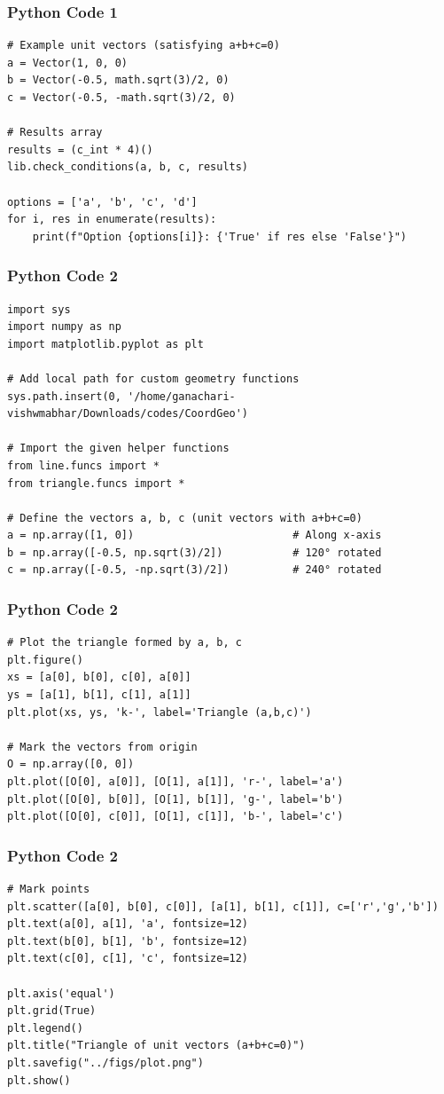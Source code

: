 \documentclass{beamer}
\begin{document}
\begin{frame}[fragile]
    \frametitle{Python Code 1}
    \begin{lstlisting}
# Example unit vectors (satisfying a+b+c=0)
a = Vector(1, 0, 0)
b = Vector(-0.5, math.sqrt(3)/2, 0)
c = Vector(-0.5, -math.sqrt(3)/2, 0)

# Results array
results = (c_int * 4)()
lib.check_conditions(a, b, c, results)

options = ['a', 'b', 'c', 'd']
for i, res in enumerate(results):
    print(f"Option {options[i]}: {'True' if res else 'False'}")
    \end{lstlisting}
\end{frame}

\begin{frame}[fragile]
    \frametitle{Python Code 2}
    \begin{lstlisting}
import sys
import numpy as np
import matplotlib.pyplot as plt

# Add local path for custom geometry functions
sys.path.insert(0, '/home/ganachari-vishwmabhar/Downloads/codes/CoordGeo')

# Import the given helper functions
from line.funcs import *
from triangle.funcs import *

# Define the vectors a, b, c (unit vectors with a+b+c=0)
a = np.array([1, 0])                         # Along x-axis
b = np.array([-0.5, np.sqrt(3)/2])           # 120° rotated
c = np.array([-0.5, -np.sqrt(3)/2])          # 240° rotated
    \end{lstlisting}
\end{frame}

\begin{frame}[fragile]
    \frametitle{Python Code 2}
    \begin{lstlisting}
# Plot the triangle formed by a, b, c
plt.figure()
xs = [a[0], b[0], c[0], a[0]]
ys = [a[1], b[1], c[1], a[1]]
plt.plot(xs, ys, 'k-', label='Triangle (a,b,c)')

# Mark the vectors from origin
O = np.array([0, 0])
plt.plot([O[0], a[0]], [O[1], a[1]], 'r-', label='a')
plt.plot([O[0], b[0]], [O[1], b[1]], 'g-', label='b')
plt.plot([O[0], c[0]], [O[1], c[1]], 'b-', label='c')
    \end{lstlisting}
\end{frame}

\begin{frame}[fragile]
    \frametitle{Python Code 2}
    \begin{lstlisting}
# Mark points
plt.scatter([a[0], b[0], c[0]], [a[1], b[1], c[1]], c=['r','g','b'])
plt.text(a[0], a[1], 'a', fontsize=12)
plt.text(b[0], b[1], 'b', fontsize=12)
plt.text(c[0], c[1], 'c', fontsize=12)

plt.axis('equal')
plt.grid(True)
plt.legend()
plt.title("Triangle of unit vectors (a+b+c=0)")
plt.savefig("../figs/plot.png")
plt.show()
    \end{lstlisting}
\end{frame}
\end{document}
